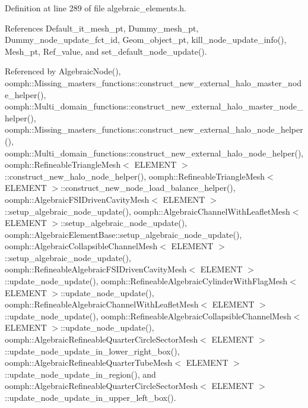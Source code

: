 Definition at line 289 of file algebraic\+\_\+elements.\+h.



References Default\+\_\+it\+\_\+mesh\+\_\+pt, Dummy\+\_\+mesh\+\_\+pt, Dummy\+\_\+node\+\_\+update\+\_\+fct\+\_\+id, Geom\+\_\+object\+\_\+pt, kill\+\_\+node\+\_\+update\+\_\+info(), Mesh\+\_\+pt, Ref\+\_\+value, and set\+\_\+default\+\_\+node\+\_\+update().



Referenced by Algebraic\+Node(), oomph\+::\+Missing\+\_\+masters\+\_\+functions\+::construct\+\_\+new\+\_\+external\+\_\+halo\+\_\+master\+\_\+node\+\_\+helper(), oomph\+::\+Multi\+\_\+domain\+\_\+functions\+::construct\+\_\+new\+\_\+external\+\_\+halo\+\_\+master\+\_\+node\+\_\+helper(), oomph\+::\+Missing\+\_\+masters\+\_\+functions\+::construct\+\_\+new\+\_\+external\+\_\+halo\+\_\+node\+\_\+helper(), oomph\+::\+Multi\+\_\+domain\+\_\+functions\+::construct\+\_\+new\+\_\+external\+\_\+halo\+\_\+node\+\_\+helper(), oomph\+::\+Refineable\+Triangle\+Mesh$<$ E\+L\+E\+M\+E\+N\+T $>$\+::construct\+\_\+new\+\_\+halo\+\_\+node\+\_\+helper(), oomph\+::\+Refineable\+Triangle\+Mesh$<$ E\+L\+E\+M\+E\+N\+T $>$\+::construct\+\_\+new\+\_\+node\+\_\+load\+\_\+balance\+\_\+helper(), oomph\+::\+Algebraic\+F\+S\+I\+Driven\+Cavity\+Mesh$<$ E\+L\+E\+M\+E\+N\+T $>$\+::setup\+\_\+algebraic\+\_\+node\+\_\+update(), oomph\+::\+Algebraic\+Channel\+With\+Leaflet\+Mesh$<$ E\+L\+E\+M\+E\+N\+T $>$\+::setup\+\_\+algebraic\+\_\+node\+\_\+update(), oomph\+::\+Algebraic\+Element\+Base\+::setup\+\_\+algebraic\+\_\+node\+\_\+update(), oomph\+::\+Algebraic\+Collapsible\+Channel\+Mesh$<$ E\+L\+E\+M\+E\+N\+T $>$\+::setup\+\_\+algebraic\+\_\+node\+\_\+update(), oomph\+::\+Refineable\+Algebraic\+F\+S\+I\+Driven\+Cavity\+Mesh$<$ E\+L\+E\+M\+E\+N\+T $>$\+::update\+\_\+node\+\_\+update(), oomph\+::\+Refineable\+Algebraic\+Cylinder\+With\+Flag\+Mesh$<$ E\+L\+E\+M\+E\+N\+T $>$\+::update\+\_\+node\+\_\+update(), oomph\+::\+Refineable\+Algebraic\+Channel\+With\+Leaflet\+Mesh$<$ E\+L\+E\+M\+E\+N\+T $>$\+::update\+\_\+node\+\_\+update(), oomph\+::\+Refineable\+Algebraic\+Collapsible\+Channel\+Mesh$<$ E\+L\+E\+M\+E\+N\+T $>$\+::update\+\_\+node\+\_\+update(), oomph\+::\+Algebraic\+Refineable\+Quarter\+Circle\+Sector\+Mesh$<$ E\+L\+E\+M\+E\+N\+T $>$\+::update\+\_\+node\+\_\+update\+\_\+in\+\_\+lower\+\_\+right\+\_\+box(), oomph\+::\+Algebraic\+Refineable\+Quarter\+Tube\+Mesh$<$ E\+L\+E\+M\+E\+N\+T $>$\+::update\+\_\+node\+\_\+update\+\_\+in\+\_\+region(), and oomph\+::\+Algebraic\+Refineable\+Quarter\+Circle\+Sector\+Mesh$<$ E\+L\+E\+M\+E\+N\+T $>$\+::update\+\_\+node\+\_\+update\+\_\+in\+\_\+upper\+\_\+left\+\_\+box().


